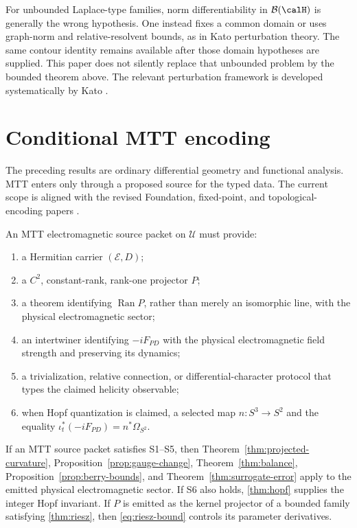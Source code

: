 \documentclass[11pt]{article}
\newcommand{\cE}{\mathcal E}
\newcommand{\cU}{\mathcal U}
\begin{document}
For unbounded Laplace-type families, norm differentiability in
\(\mathcal B(\calH)\) is generally the wrong hypothesis.  One instead fixes a
common domain or uses graph-norm and relative-resolvent bounds, as in Kato
perturbation theory.  The same contour identity remains available after those
domain hypotheses are supplied.  This paper does not silently replace that
unbounded problem by the bounded theorem above.  The relevant perturbation
framework is developed systematically by Kato \cite{kato1995}.

\section{Conditional MTT encoding}
\label{sec:mtt}

The preceding results are ordinary differential geometry and functional
analysis.  MTT enters only through a proposed source for the typed data.  The
current scope is aligned with the revised Foundation, fixed-point, and
topological-encoding papers
\cite{nero_foundations_v9,nero_fixedpoints_i_v7,nero_topological_v2}.

\begin{definition}\label{def:source-contract}
An MTT electromagnetic source packet on \(\cU\) must provide:
\begin{enumerate}[label=\textnormal{S\arabic*.},leftmargin=3.5em]
\item a Hermitian carrier \((\cE,D)\);
\item a \(C^2\), constant-rank, rank-one projector \(P\);
\item a theorem identifying \(\operatorname{Ran}P\), rather than merely an
isomorphic line, with the physical electromagnetic sector;
\item an intertwiner identifying \(-iF_{PD}\) with the physical
electromagnetic field strength and preserving its dynamics;
\item a trivialization, relative connection, or differential-character
protocol that types the claimed helicity observable;
\item when Hopf quantization is claimed, a selected map
\(n:S^3\to S^2\) and the equality
\(\iota_t^*(-iF_{PD})=n^*\Omega_{S^2}\).
\end{enumerate}
\end{definition}

\begin{theorem}
\label{thm:conditional-pullback}
If an MTT source packet satisfies S1--S5, then
Theorem~\ref{thm:projected-curvature},
Proposition~\ref{prop:gauge-change}, Theorem~\ref{thm:balance},
Proposition~\ref{prop:berry-bounds}, and
Theorem~\ref{thm:surrogate-error} apply to the emitted physical
electromagnetic sector.  If S6 also holds, \cref{thm:hopf} supplies the
integer Hopf invariant.  If \(P\) is emitted as the kernel projector of a
bounded family satisfying \cref{thm:riesz}, then
\cref{eq:riesz-bound} controls its parameter derivatives.
\end{theorem}
\end{document}
